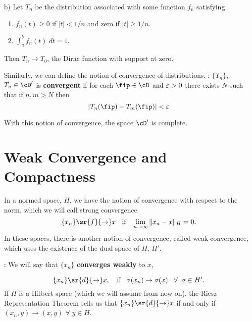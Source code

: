 \noi 
b) Let $T_n$ be the distribution associated with some function $f_n$ 
satisfying
\begin{enumerate}
\item $f_n(t)\geq0$ if $|t|<1/n$ and zero if $|t|\geq1/n$.
\item $\int_a^b f_n(t)\;dt=1$,
\end{enumerate}
Then $T_n\to T_0$, the Dirac function with support at zero.

\espa
Similarly, we can define the notion of convergence of
distributions. 
\espa
{}:
$\{T_n\}$, $T_n\in\cD'$ is {\bf convergent} if for each 
$\fip\in\cD$ and $\mbox{$\varepsilon$}>0$ there exists $N$ such that if $n,m>N$ then
$$ |T_n(\fip)-T_m(\fip)|<\eps$$

\noi With this notion of convergence, the space $\cD'$ is complete.
 
\section{Weak Convergence and Compactness}

In a normed space, $H$, we have the notion of convergence with respect
to the norm, which we will call strong convergence
\[
\{x_n\} \sr{f}{\rightarrow} x \;\; \mbox{ if } \;\;\lim_{n \to \infty} \|x_n - x\|_H = 0.
\]
% 
In these spaces, there is another notion of convergence, called weak convergence,
which uses the existence of the dual space of $H$, $H'$.

\espa
\noi
 : 
We will say that $\{x_n\}$ {\bf converges weakly} to $x$,

\[
\{x_n\} \sr{d}{\rightarrow} x, \;\; \mbox{ if } \;\; \sigma(x_n) \rightarrow \sigma(x) \;\;\; \forall \;\; \sigma \in H'.
\]
%
If $H$ is a Hilbert space (which we will assume from now on),
the Riesz Representation Theorem tells us that $\{x_n\}\sr{d}{\rightarrow}
x$ if and only if $(x_n,y) \rightarrow (x,y)$  $ \forall \;y \in H$.

